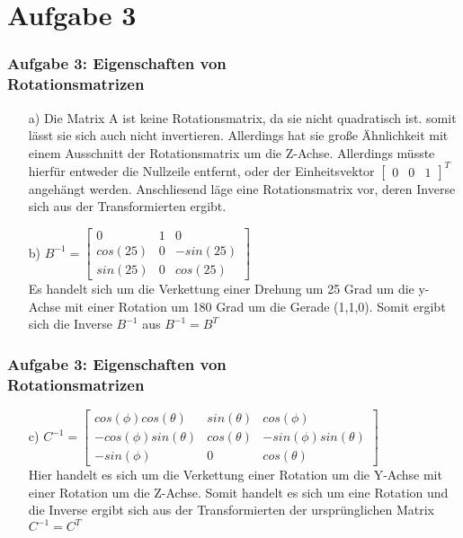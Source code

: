 \documentclass[accentcolor=tud9c,colorbacktitle,inverttitle,landscape,german,presentation,t]{tudbeamer}
\begin{document}
\section{Aufgabe 3}
\begin{frame}
	\frametitle{Aufgabe 3: Eigenschaften von \\ Rotationsmatrizen} 
	\begin{itemize}
		\item[a)] Die Matrix A ist keine Rotationsmatrix, da sie nicht quadratisch ist. somit lässt sie sich auch nicht invertieren. Allerdings hat sie große Ähnlichkeit mit einem Ausschnitt der Rotationsmatrix um die Z-Achse. Allerdings müsste hierfür entweder die Nullzeile entfernt, oder der Einheitsvektor $\begin{bmatrix} 0 & 0 & 1\end{bmatrix}^T$angehängt werden. Anschliesend läge eine Rotationsmatrix vor, deren Inverse sich aus der Transformierten ergibt.%
		\item[b)] $B^{-1}=\begin{bmatrix}
		0 & 1 & 0\\
		cos(25) & 0 & -sin(25)\\
		sin(25) & 0 & cos(25)
		\end{bmatrix} $ \\
		Es handelt sich um die Verkettung einer Drehung um 25 Grad um die y-Achse mit einer Rotation um 180 Grad um die Gerade (1,1,0). Somit ergibt sich die Inverse $B^{-1}$ aus $B^{-1}=B^{T} $
	\end{itemize}
\end{frame}

\begin{frame}
	\frametitle{Aufgabe 3: Eigenschaften von \\ Rotationsmatrizen} 
	\begin{itemize}
		\item[c)] $C^{-1}=\begin{bmatrix}
		cos(\phi)cos(\theta) & sin(\theta) & cos(\phi)\\
		-cos(\phi)sin(\theta) & cos(\theta) & -sin(\phi)sin(\theta) \\
		-sin(\phi) & 0 & cos(\theta) 
		\end{bmatrix} $ \\
		Hier handelt es sich um die Verkettung einer Rotation um die Y-Achse mit einer Rotation um die Z-Achse. Somit handelt es sich um eine Rotation und die Inverse ergibt sich aus der Transformierten der ursprünglichen Matrix $C^{-1}=C^T$
	\end{itemize}
\end{frame}
\end{document}
